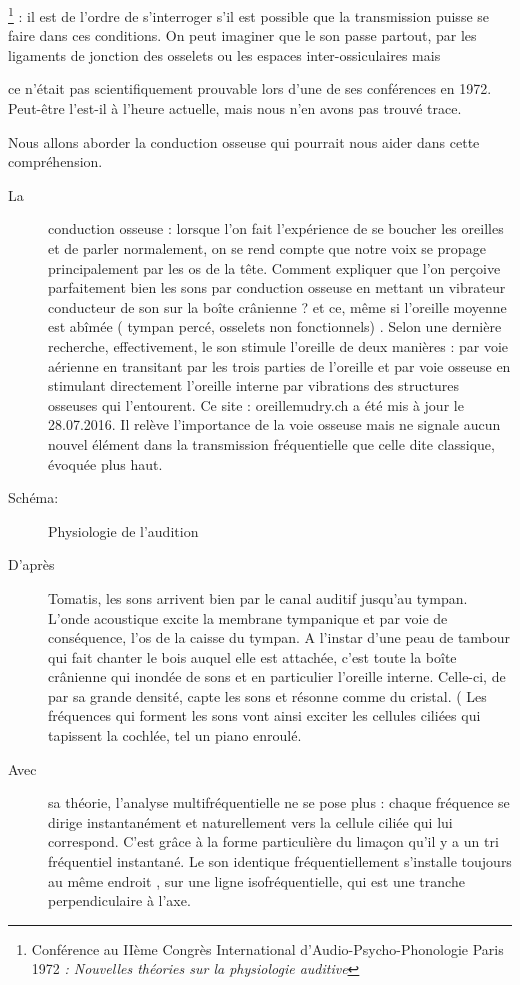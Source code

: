 \footnote{Conférence au IIème Congrès International d'Audio-Psycho-Phonologie
Paris 1972 \emph{: Nouvelles théories sur la physiologie auditive}} : il est de l'ordre de s'interroger s'il est possible que la transmission
puisse se faire dans ces conditions. On peut imaginer que le son passe
partout, par les ligaments de jonction des osselets ou les espaces
inter-ossiculaires mais

ce n'était pas scientifiquement prouvable lors d'une de ses conférences
en 1972. Peut-être l'est-il à l'heure actuelle, mais nous n'en avons
pas trouvé trace. 

Nous allons aborder la conduction osseuse qui pourrait nous aider
dans cette compréhension.
\begin{description}
\item [{La}] conduction osseuse : lorsque l'on fait l'expérience de se
boucher les oreilles et de parler normalement, on se rend compte que
notre voix se propage principalement par les os de la tête. Comment
expliquer que l'on perçoive parfaitement bien les sons par conduction
osseuse en mettant un vibrateur conducteur de son sur la boîte crânienne
? et ce, même si l'oreille moyenne est abîmée ( tympan percé, osselets
non fonctionnels) . Selon une dernière recherche, effectivement, le
son stimule l'oreille de deux manières : par voie aérienne en transitant
par les trois parties de l'oreille et par voie osseuse en stimulant
directement l'oreille interne par vibrations des structures osseuses
qui l'entourent. Ce site : oreillemudry.ch a été mis à jour le 28.07.2016.
Il relève l'importance de la voie osseuse mais ne signale aucun nouvel
élément dans la transmission fréquentielle que celle dite classique,
évoquée plus haut. 
\item [{Schéma:}] Physiologie de l\textquoteright audition 
\item [{D'après}] Tomatis, les sons arrivent bien par le canal auditif
jusqu'au tympan. L'onde acoustique excite la membrane tympanique et
par voie de conséquence, l'os de la caisse du tympan. A l'instar d'une
peau de tambour qui fait chanter le bois auquel elle est attachée,
c'est toute la boîte crânienne qui inondée de sons et en particulier
l'oreille interne. Celle-ci, de par sa grande densité, capte les sons
et résonne comme du cristal. (
Les fréquences qui forment les sons vont ainsi exciter les cellules
ciliées qui tapissent la cochlée, tel un piano enroulé. 
\item [{Avec}] sa théorie, l'analyse multifréquentielle ne se pose plus
: chaque fréquence se dirige instantanément et naturellement\emph{
}vers la cellule ciliée qui lui correspond. C'est grâce à la forme
particulière\emph{ }du limaçon qu'il y a un tri fréquentiel instantané.
Le son identique fréquentiellement s'installe toujours au même endroit
, sur une ligne isofréquentielle, qui est une tranche perpendiculaire
à l'axe.
\end{description}
